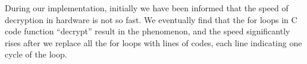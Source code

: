 \documentclass[11pt]{article}
\begin{document}
During our implementation, initially we have been informed that the speed of decryption in hardware is not so fast. We eventually find that the for loops in C code function “decrypt” result in the phenomenon, and the speed significantly rises after we replace all the for loops with lines of codes, each line indicating one cycle of the loop.


\end{document}
